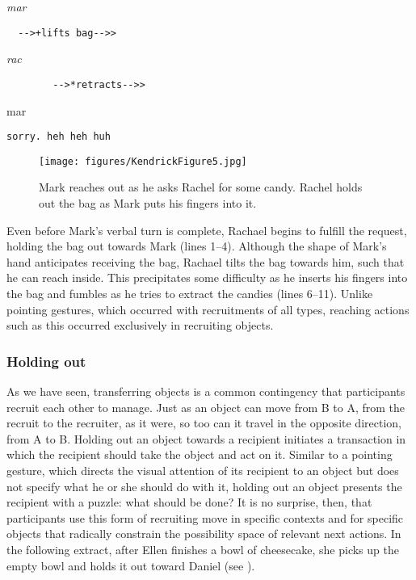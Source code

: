 \documentclass[output=paper,nonflat,modfont,draft]{langsci/langscibook}
\begin{document}

\begin{transbox}{11}{\textit{mar}}
\begin{verbatim}
  -->+lifts bag-->>
\end{verbatim}
\end{transbox}

\begin{transbox}{12}{\textit{rac}}
\begin{verbatim}
        -->*retracts-->>
\end{verbatim}
\end{transbox}

\begin{transbox}{13}{mar}
\begin{verbatim}
sorry. heh heh huh
\end{verbatim}
\end{transbox}\bigskip

\begin{figure}
\caption{Mark reaches out as he asks Rachel for some candy. Rachel holds out the bag as Mark puts his fingers into it.}
\texttt{[image: figures/KendrickFigure5.jpg]}
\label{fig:kendrick:5}
\end{figure}

Even before Mark’s verbal turn is complete, Rachael begins to fulfill the request, holding the bag out towards Mark (lines 1--4). Although the shape of Mark’s hand anticipates receiving the bag, Rachael tilts the bag towards him, such that he can reach inside. This precipitates some difficulty as he inserts his fingers into the bag and fumbles as he tries to extract the candies (lines 6--11). Unlike pointing gestures, which occurred with recruitments of all types, reaching actions such as this occurred exclusively in recruiting objects.

\subsubsection{Holding out}\label{sec:kendrick:4.1.3}
As we have seen, transferring objects is a common contingency that participants recruit each other to manage. Just as an object can move from B to A, from the recruit to the recruiter, as it were, so too can it travel in the opposite direction, from A to B. Holding out an object towards a recipient initiates a transaction in which the recipient should take the object and act on it. Similar to a pointing gesture, which directs the visual attention of its recipient to an object but does not specify what he or she should do with it, holding out an object presents the recipient with a puzzle: what should be done? It is no surprise, then, that participants use this form of recruiting move in specific contexts and for specific objects that radically constrain the possibility space of relevant next actions. In the following extract, after Ellen finishes a bowl of cheesecake, she picks up the empty bowl and holds it out toward Daniel (see ).
\end{document}
